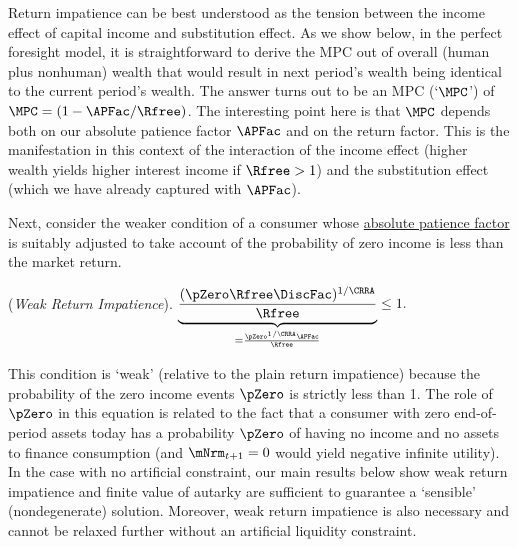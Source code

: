 \documentclass[BufferStockTheory]{subfiles}
\begin{document}
Return impatience can be best understood as the tension between the income effect of capital income and substitution effect. As we show below, in the perfect foresight model, it is straightforward to derive the MPC out of overall (human plus nonhuman) wealth that would result in next period's wealth being identical to the current period's wealth.  The answer turns out to be an MPC (`$\MPC$') of $\MPC=(1-\APFac/\Rfree)$.  The interesting point here is that $\MPC$ depends both on our absolute patience factor $\APFac$ and on the return factor.  This is the manifestation in this context of the interaction of the income effect (higher wealth yields higher interest income if $\Rfree>1$) and the substitution effect (which we have already captured with $\APFac$).  


Next, consider the weaker condition of a consumer whose \hyperlink{APFAC}{absolute patience factor} is suitably adjusted to take account of the probability of zero income is less than the market return. 

\hypertarget{WRIC}{}
\begin{assumL} (\textit{Weak Return Impatience}). \label{ass:WRIC}
$\underbrace{\frac{(\pZero \Rfree \DiscFac)^{1/\CRRA}}{\Rfree}}_{ = \frac{\pZero^{1/\CRRA} \APFac}{\Rfree}} \leq 1. \phantom{\text{{\WRIC}:~~}}$
%
\end{assumL}

This condition is `weak' (relative to the plain return impatience) because the probability of the zero income events $\pZero$ is strictly less than 1.  The role of $\pZero$ in this equation is related to the fact that a consumer with zero end-of-period assets today has a probability $\pZero$ of having no income and no assets to finance consumption (and $\mNrm_{t+1}=0$ would yield negative infinite utility).  In the case with no artificial constraint, our main results below show weak return impatience and finite value of autarky are sufficient to guarantee a `sensible' (nondegenerate) solution. Moreover, weak return impatience is also necessary and cannot be relaxed further without an artificial liquidity constraint.\marginpar{\tiny \textcolor{orange}{Review the remark under comment in latex. what do we mean by does not approach irrelevance? Should this even be a Remark?}}

\begin{comment}
\begin{remark}
Even though $\pZero^{1/\CRRA} \RPFac\rightarrow 0$ as $\pZero\rightarrow 0$ \textcolor{orange}{the weak return impatience condition \textit{does not} approach irrelevance} as the possibility of the zero income event approaches zero.  Instead, we show below that the model with a natural constraint approaches the solution to a model with an artificial constraint. %
\end{remark}
\end{comment}
\end{document}
